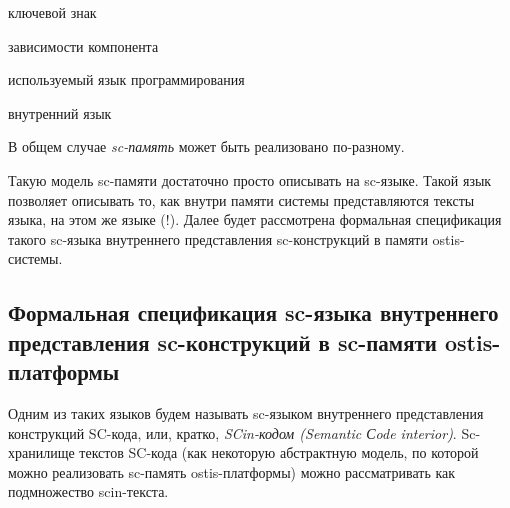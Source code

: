 \begin{SCn}
\begin{scnindent}
	\begin{scnreltolist}{ключевой знак}
	\end{scnreltolist}
    \begin{scnindent}
    \end{scnindent}
\end{scnindent}
\begin{scnrelfromset}{зависимости компонента}
\end{scnrelfromset}
\begin{scnrelfromlist}{используемый язык программирования}
\end{scnrelfromlist}
\begin{scnrelfromlist}{внутренний язык}
\end{scnrelfromlist}
\end{SCn}

В общем случае \textit{sc-память} может быть реализовано по-разному.

Такую модель sc-памяти достаточно просто описывать на sc-языке. Такой язык позволяет описывать то, как внутри памяти системы представляются тексты языка, на этом же языке (!). Далее будет рассмотрена формальная спецификация такого sc-языка внутреннего представления sc-конструкций в памяти ostis-системы.

\subsection{Формальная спецификация sc-языка внутреннего представления sc-конструкций в sc-памяти ostis-платформы}
\label{sec_soft_platform_scin_code}

Одним из таких языков будем называть sc-языком внутреннего представления конструкций SC-кода, или, кратко, \textit{SCin-кодом (Semantic Сode interior)}. Sc-хранилище текстов SC-кода (как некоторую абстрактную модель, по которой можно реализовать sc-память ostis-платформы) можно рассматривать как подмножество scin-текста.

